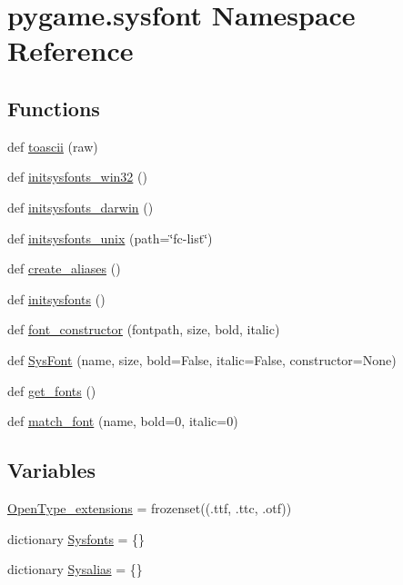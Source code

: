 \hypertarget{namespacepygame_1_1sysfont}{}\section{pygame.\+sysfont Namespace Reference}
\label{namespacepygame_1_1sysfont}
\subsection*{Functions}
\begin{DoxyCompactItemize}
\item 
def \hyperlink{namespacepygame_1_1sysfont_acdfcec8414fe9aefb7cda01ac296a90d}{toascii} (raw)
\item 
def \hyperlink{namespacepygame_1_1sysfont_a4c6fd06092a769ddea25f6d6689123c1}{initsysfonts\+\_\+win32} ()
\item 
def \hyperlink{namespacepygame_1_1sysfont_a43a2fb8cddbab24516864384310e224f}{initsysfonts\+\_\+darwin} ()
\item 
def \hyperlink{namespacepygame_1_1sysfont_a120c4d1f2af08bd76499963e735031e6}{initsysfonts\+\_\+unix} (path=\char`\"{}fc-\/list\char`\"{})
\item 
def \hyperlink{namespacepygame_1_1sysfont_a29cee381545a4eb1dec4c7b564fba4b1}{create\+\_\+aliases} ()
\item 
def \hyperlink{namespacepygame_1_1sysfont_a768a000d8d77d24996fc02cad129f52a}{initsysfonts} ()
\item 
def \hyperlink{namespacepygame_1_1sysfont_ac9170eb4a3d4e87d83a916340f278c1e}{font\+\_\+constructor} (fontpath, size, bold, italic)
\item 
def \hyperlink{namespacepygame_1_1sysfont_aabc5b6a67cce402313f524fcc4736f88}{Sys\+Font} (name, size, bold=False, italic=False, constructor=None)
\item 
def \hyperlink{namespacepygame_1_1sysfont_acf15c88c489eeec73f822f05208aebf7}{get\+\_\+fonts} ()
\item 
def \hyperlink{namespacepygame_1_1sysfont_ac3b76edd6da1240d04a304494b146533}{match\+\_\+font} (name, bold=0, italic=0)
\end{DoxyCompactItemize}
\subsection*{Variables}
\begin{DoxyCompactItemize}
\item 
\hyperlink{namespacepygame_1_1sysfont_aaa890b33881f8a07980f1d06b8a257aa}{Open\+Type\+\_\+extensions} = frozenset((\textquotesingle{}.ttf\textquotesingle{}, \textquotesingle{}.ttc\textquotesingle{}, \textquotesingle{}.otf\textquotesingle{}))
\item 
dictionary \hyperlink{namespacepygame_1_1sysfont_a80767b051c6fdf72ba3bcaeb9150ca79}{Sysfonts} = \{\}
\item 
dictionary \hyperlink{namespacepygame_1_1sysfont_afa74eda06733ccb879a491504a973a78}{Sysalias} = \{\}
\end{DoxyCompactItemize}


